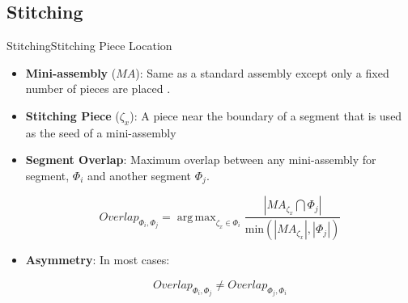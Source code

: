 \documentclass[handout,10pt]{beamer}  %
\DeclareMathOperator*{\argmax}{arg\,max} %
\begin{document}
\subsection{Stitching}
\begin{frame}{Stitching}{Stitching Piece Location}
  \begin{itemize}
    \item \textbf{Mini-assembly} (\textbf{$MA$}): Same as a standard assembly except only a fixed number of pieces are placed .
    \vfill    
    \item \textbf{Stitching Piece} (\textbf{$\zeta_x$}): A piece near the boundary of a segment that is used as the seed of a mini-assembly
    \vfill
    \item \textbf{Segment Overlap}: Maximum overlap between any mini-assembly for segment, $\Phi_i$ and another segment $\Phi_j$.
    \vfill
		\begin{center}  
		  \vspace{-2em}
			\begin{equation} \label{eq:segmentOverlap}
			  Overlap_{\Phi_i,\Phi_j} = \argmax_{\zeta_x \in \Phi_i} {\frac{|MA_{\zeta_x} \bigcap \Phi_j|}{\text{min}(|MA_{\zeta_x}|, |\Phi_j|)}}
			\end{equation}
			\vspace{-2em}
		\end{center}      
    \vfill
    \item \textbf{Asymmetry}: In most cases:
	  \begin{center}
	    \vspace{-2em}
	    \begin{equation}
	      Overlap_{\Phi_i,\Phi_j} \neq Overlap_{\Phi_j,\Phi_i}
	    \end{equation}
	  \end{center}  
	  \vspace{-1em}
  \end{itemize}
\end{frame}
\end{document}
